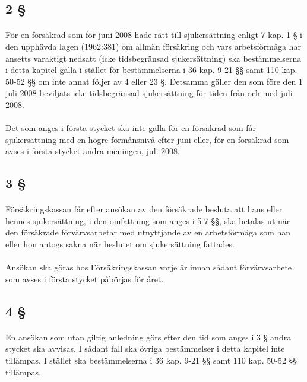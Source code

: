 \documentclass[a4paper,notitlepage,openany,10pt]{book}
\begin{document}
\subsection*{2 §}
\paragraph*{}
För en försäkrad som för juni 2008 hade rätt till sjukersättning enligt 7 kap. 1 § i den upphävda lagen (1962:381) om allmän försäkring och vars arbetsförmåga har ansetts varaktigt nedsatt (icke tidsbegränsad sjukersättning) ska bestämmelserna i detta kapitel gälla i stället för bestämmelserna i 36 kap. 9-21 §§ samt 110 kap. 50-52 §§ om inte annat följer av 4 eller 23 §. Detsamma gäller den som före den 1 juli 2008 beviljats icke tidsbegränsad sjukersättning för tiden från och med juli 2008.
\paragraph*{}
Det som anges i första stycket ska inte gälla för en försäkrad som får sjukersättning med en högre förmånsnivå efter juni eller, för en försäkrad som avses i första stycket andra meningen, juli 2008.
\subsection*{3 §}
\paragraph*{}
Försäkringskassan får efter ansökan av den försäkrade besluta att hans eller hennes sjukersättning, i den omfattning som anges i 5-7 §§, ska betalas ut när den försäkrade förvärvsarbetar med utnyttjande av en arbetsförmåga som han eller hon antogs sakna när beslutet om sjukersättning fattades.
\paragraph*{}
Ansökan ska göras hos Försäkringskassan varje år innan sådant förvärvsarbete som avses i första stycket påbörjas för året.
\subsection*{4 §}
\paragraph*{}
En ansökan som utan giltig anledning görs efter den tid som anges i 3 § andra stycket ska avvisas. I sådant fall ska övriga bestämmelser i detta kapitel inte tillämpas. I stället ska bestämmelserna i 36 kap. 9-21 §§ samt 110 kap. 50-52 §§ tillämpas.
\end{document}
